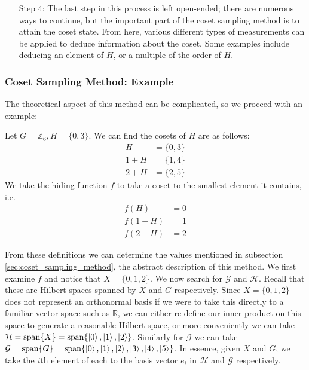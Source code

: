 \documentclass{beamer}
\renewcommand{\ket}{\Ket}
\renewcommand{\ket}{\Ket}
\newcommand{\vspan}[1]{\textnormal{span}\{#1\}}
\newcommand{\bb}[1]{\mathbb{#1}}
\renewcommand{\cal}[1]{\mathcal{#1}}
\begin{document}
\begin{frame}
\begin{enumerate}
        \item[Step 4:]
            The last step in this process is left open-ended; there are numerous ways to continue, but the important part of the coset sampling method is to attain the coset state. From here, various different types of measurements can be applied to deduce information about the coset. Some examples include deducing an element of $H$, or a multiple of the order of $H$.
        \end{enumerate}
\end{frame}

\begin{frame}
\frametitle{Coset Sampling Method: Example}
        The theoretical aspect of this method can be complicated, so we proceed with an example:
        \begin{example}\label{sec:coset_sampling_method}
            Let $G = \bb{Z}_6, H = \{0, 3\}$. We can find the cosets of $H$ are as follows:
            \begin{align*}
                H &= \{0, 3\}\\
                1 + H &= \{1, 4\}\\
                2 + H &= \{2, 5\}
            \end{align*}
            We take the hiding function $f$ to take a coset to the smallest element it contains, i.e. 
            \begin{align*}
                f(H) &= 0\\
                f(1 + H) &= 1\\
                f(2 + H) &= 2
            \end{align*}

            From these definitions we can determine the values mentioned in subsection \ref{sec:coset_sampling_method}, the abstract description of this method.
            We first examine $f$ and notice that $X = \{0, 1, 2\}$.
            We now search for $\cal{G}$ and $\cal{H}$.
            Recall that these are Hilbert spaces spanned by $X$ and $G$ respectively.
            Since $X = \{0, 1, 2\}$ does not represent an orthonormal basis if we were to take this directly to a familiar vector space such as $\bb{R}$, we can either re-define our inner product on this space to generate a reasonable Hilbert space, or more conveniently we can take $\cal{H} = \vspan{X} = \vspan{\ket{0}, \ket{1}, \ket{2}}$.
            Similarly for $\cal{G}$ we can take $\cal{G} = \vspan{G} = \vspan{\ket{0}, \ket{1}, \ket{2}, \ket{3}, \ket{4}, \ket{5}}$.
            In essence, given $X$ and $G$, we take the $i$th element of each to the basis vector $e_i$ in $\cal{H}$ and $\cal{G}$ respectively.
    

\end{example}
\end{frame}
\end{document}
